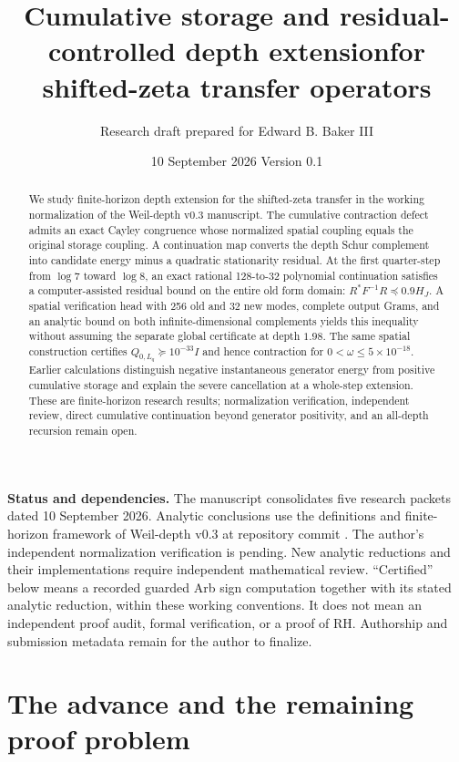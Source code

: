 \documentclass[11pt]{article}
\title{Cumulative storage and residual-controlled depth extension\newline for shifted-zeta transfer operators}
\author{Research draft prepared for Edward B. Baker III}
\date{10 September 2026 \quad\textbullet\quad Version 0.1}
\theoremstyle{remark}\newtheorem{remark}[theorem]{Remark}
\newcommand{\rec}[1]{\texttt{\detokenize{#1}}}
\begin{document}
\maketitle
\begin{abstract}
We study finite-horizon depth extension for the shifted-zeta transfer in the working normalization of the Weil-depth v0.3 manuscript. The cumulative contraction defect admits an exact Cayley congruence whose normalized spatial coupling equals the original storage coupling. A continuation map converts the depth Schur complement into candidate energy minus a quadratic stationarity residual. At the first quarter-step from $\log 7$ toward $\log 8$, an exact rational 128-to-32 polynomial continuation satisfies a computer-assisted residual bound on the entire old form domain: $R^*F^{-1}R\preceq0.9H_J$. A spatial verification head with 256 old and 32 new modes, complete output Grams, and an analytic bound on both infinite-dimensional complements yields this inequality without assuming the separate global certificate at depth $1.98$. The same spatial construction certifies $Q_{0,L_q}\succeq10^{-33}I$ and hence contraction for $0<\omega\le5\times10^{-18}$. Earlier calculations distinguish negative instantaneous generator energy from positive cumulative storage and explain the severe cancellation at a whole-step extension. These are finite-horizon research results; normalization verification, independent review, direct cumulative continuation beyond generator positivity, and an all-depth recursion remain open.
\end{abstract}
\noindent\textbf{Status and dependencies.} The manuscript consolidates five research packets dated 10 September 2026. Analytic conclusions use the definitions and finite-horizon framework of Weil-depth v0.3 at repository commit \rec{a566944dc1be2899e37fce3d0e857516ced33d8f} \cite{WeilDepth}. The author's independent normalization verification is pending. New analytic reductions and their implementations require independent mathematical review. ``Certified'' below means a recorded guarded Arb sign computation together with its stated analytic reduction, within these working conventions. It does not mean an independent proof audit, formal verification, or a proof of RH. Authorship and submission metadata remain for the author to finalize.

\clearpage
\tableofcontents
\newpage
\section{The advance and the remaining proof problem}
\end{document}
